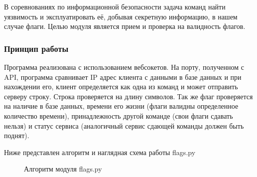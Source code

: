 В соревнованиях по информационной безопасности задача команд найти уязвимость и эксплуатировать её, добывая секретную информацию, в нашем случае флаги. Целью модуля является прием и проверка на валидность флагов.

\subsubsection{Принцип работы}

Программа реализована с использованием вебсокетов. На порту, полученном с API, программа сравнивает IP адрес клиента с данными в базе данных и при нахождении его, клиент определяется как одна из команд и может отправить серверу строку. Строка проверяется на длину символов. Так же флаг проверяется на наличие в базе данных, времени его жизни (флаги валидны определенное количество времени), принадлежность другой команде (свои флаги сдавать нельзя) и статус сервиса (аналогичный сервис сдающей команды должен быть поднят). 

Ниже представлен алгоритм и наглядная схема работы flags.py

\begin{figure}[ht!]
\caption{Алгоритм модуля flags.py}
\end{figure} 

